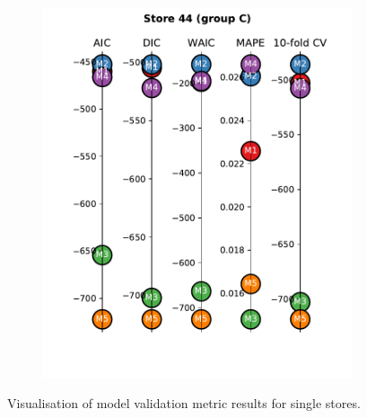 \documentclass[english, 12pt, a4paper, sci, utf8, a-1b, online]{aaltothesis}
\begin{document}
\begin{abstractpage}[english]
\begin{figure}[hbt]
\begin{subfigure}[htb]{0.3\textwidth}
		\includegraphics[width=\textwidth]{../plots/metrics/metrics_plot_single_store_44_of_C.pdf}
	\end{subfigure}
	\caption{\label{fig:single_store_results_visualisation}Visualisation of model validation metric results for single stores.}
\end{figure}







\end{abstractpage}
\end{document}
